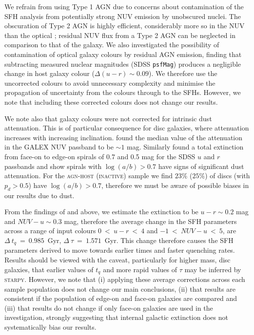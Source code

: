 We refrain from using Type 1 AGN due to concerns about contamination of the SFH analysis from potentially strong NUV emission by unobscured nuclei. The obscuration of Type 2 AGN is highly efficient, considerably more so in the NUV than the optical \citep{Simmons11}; residual NUV flux from a Type 2 AGN can be neglected in comparison to that of the galaxy. We also investigated the possibility of contamination of optical galaxy colours by residual AGN emission, finding that subtracting measured nuclear magnitudes (SDSS {\tt psfMag}) produces a negligible change in host galaxy colour ($\Delta(u-r) \sim 0.09$). We therefore use the uncorrected colours to avoid unnecessary complexity and minimise the propagation of uncertainty from the colours through to the SFHs. However, we note that including these corrected colours does not change our results.

We note also that galaxy colours were not corrected for intrinsic dust attenuation. This is of particular consequence for disc galaxies, where attenuation increases with increasing inclination. \cite{Buat05} found the median value of the attenuation in the GALEX NUV passband to be $\sim 1$ mag. Similarly \cite{masters10a} found a total extinction from face-on to edge-on spirals of 0.7 and 0.5 mag for the SDSS $u$ and $r$ passbands and show spirals with $\log(a/b) > 0.7$ have signs of significant dust attenuation. For the \textsc{agn-host} (\textsc{inactive}) sample we find $23\%$ ($25\%$) of discs (with $p_d > 0.5$) have $\log(a/b) > 0.7$, therefore we must be aware of possible biases in our results due to dust. 

From the findings of \cite{masters10a} and \cite{Buat05} above, we estimate the extinction to be $u-r \sim 0.2$ mag and $NUV-u \sim 0.3$ mag, therefore the average change in the SFH parameters across a range of input colours $0 ~<~u-r~<~4$ and $-1~<~NUV-u~<~5$,  are $\Delta~t_q~=~0.985$~Gyr, $\Delta~\tau~=~1.571$~Gyr. This change therefore causes the SFH parameters derived to move towards earlier times and faster quenching rates. Results should be viewed with the caveat, particularly for higher mass, disc galaxies, that earlier values of $t_q$ and more rapid values of $\tau$ may be inferred by \textsc{starpy}. However, we note that (i) applying these average corrections across each sample population does not change our main conclusions, (ii) that results are consistent if the population of edge-on and face-on galaxies are compared and (iii) that results do not change if only face-on galaxies are used in the investigation, strongly suggesting that internal galactic extinction does not systematically bias our results.

